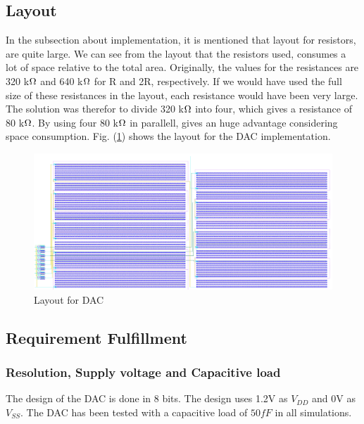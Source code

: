 \documentclass[english, 12pt, a4paper]{ifimaster}
\begin{document}
\subsection{Layout}
In the subsection about implementation, it is mentioned that layout for resistors, are quite 
large. We can see from the layout that the resistors used, consumes a lot of space relative to the total area. Originally, the values for the resistances are
320 k\(\ohm\) and 640 k\(\ohm\) for R and 2R, respectively. If we would have used the full size of these resistances in the layout, each resistance would have been
very large. The solution was therefor to divide 320 k\(\ohm\) into four, which gives a resistance of 80 k\(\ohm\). By using four 80 k\(\ohm\) in parallell, gives an huge
advantage considering space consumption. Fig. (\ref{fig:layout:dac}) shows the layout for the DAC implementation.
\begin{figure}[!ht]
 \centering
 \includegraphics[width=\textwidth]{img/layout/dac}
 \caption{Layout for DAC}
 \label{fig:layout:dac}
\end{figure}

\subsection{Requirement Fulfillment}

\subsubsection{Resolution, Supply voltage and Capacitive load}
The design of the DAC is done in 8 bits. The design uses 1.2V as \(V_{DD}\) and 0V as \(V_{SS}\).
The DAC has been tested with a capacitive load of \(50fF\) in all simulations.
\end{document}
